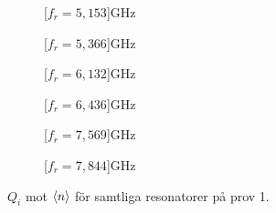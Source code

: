 \documentclass[../../main.tex]{subfiles}
\begin{document}
\begin{figure}[H]
    \begin{subfigure}{0.33\textwidth}
        \centering
        \setlength{}
        \setlength\figureheight{10em}
        
        \caption{\unit[$f_r=5,153$]{GHz}}
    \end{subfigure}
    \begin{subfigure}{0.33\textwidth}
        \centering
        \setlength{}
        \setlength\figureheight{10em}
        
        \caption{\unit[$f_r=5,366$]{GHz}}
    \end{subfigure}
    \begin{subfigure}{0.33\textwidth}
        \centering
        \setlength{}
        \setlength\figureheight{10em}
        
        \caption{\unit[$f_r=6,132$]{GHz}}
    \end{subfigure}
    
    \begin{subfigure}{0.33\textwidth}
        \centering
        \setlength{}
        \setlength\figureheight{10em}
        
        \caption{\unit[$f_r=6,436$]{GHz}}
    \end{subfigure}
    \begin{subfigure}{0.33\textwidth}
        \centering
        \setlength{}
        \setlength\figureheight{10em}
        
        \caption{\unit[$f_r=7,569$]{GHz}}
    \end{subfigure}
    \begin{subfigure}{0.33\textwidth}
        \centering
        \setlength{}
        \setlength\figureheight{10em}
        
        \caption{\unit[$f_r=7,844$]{GHz}}
    \end{subfigure}
    \caption{$Q_i$ mot $\expval{n}$ för samtliga resonatorer på prov 1.}
\end{figure}


\end{document}
